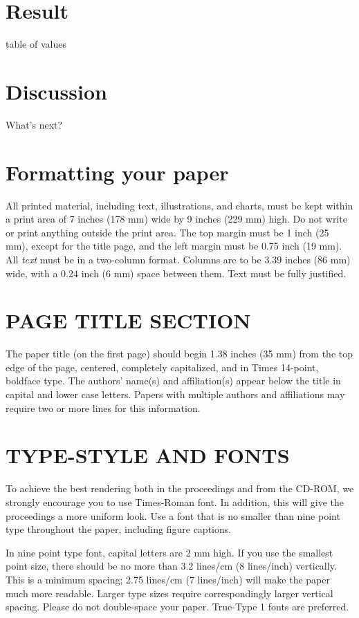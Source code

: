 \documentclass{article}
\begin{document}
\section{Result}
\label{sec:result}
table of values
\section{Discussion}
\label{sec:discussion}
What's next?

\section{Formatting your paper}
\label{sec:format}

All printed material, including text, illustrations, and charts, must be kept
within a print area of 7 inches (178 mm) wide by 9 inches (229 mm) high. Do
not write or print anything outside the print area. The top margin must be 1
inch (25 mm), except for the title page, and the left margin must be 0.75 inch
(19 mm).  All {\it text} must be in a two-column format. Columns are to be 3.39
inches (86 mm) wide, with a 0.24 inch (6 mm) space between them. Text must be
fully justified.

\section{PAGE TITLE SECTION}
\label{sec:pagestyle}

The paper title (on the first page) should begin 1.38 inches (35 mm) from the
top edge of the page, centered, completely capitalized, and in Times 14-point,
boldface type.  The authors' name(s) and affiliation(s) appear below the title
in capital and lower case letters.  Papers with multiple authors and
affiliations may require two or more lines for this information.

\section{TYPE-STYLE AND FONTS}
\label{sec:typestyle}

To achieve the best rendering both in the proceedings and from the CD-ROM, we
strongly encourage you to use Times-Roman font.  In addition, this will give
the proceedings a more uniform look.  Use a font that is no smaller than nine
point type throughout the paper, including figure captions.

In nine point type font, capital letters are 2 mm high.  If you use the
smallest point size, there should be no more than 3.2 lines/cm (8 lines/inch)
vertically.  This is a minimum spacing; 2.75 lines/cm (7 lines/inch) will make
the paper much more readable.  Larger type sizes require correspondingly larger
vertical spacing.  Please do not double-space your paper.  True-Type 1 fonts
are preferred.
\end{document}
